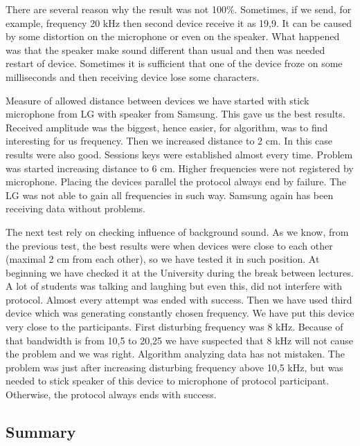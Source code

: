 \documentclass[11pt,titlepage]{article}
\theoremstyle{plain}
\begin{document}
\vspace{5mm}

There are several reason why the result was not 100\%. Sometimes, if we send, for example, frequency 20 kHz then second device receive it as 19,9. It can be caused by some distortion on the microphone or even on the speaker. What happened was that the speaker make sound different than usual and then was needed restart of device. Sometimes it is sufficient that one of the device froze on some milliseconds and then receiving device lose some characters. 

\vspace{5mm}

Measure of allowed distance between devices we have started with stick microphone from LG with speaker from Samsung. This gave us the best results. Received amplitude was the biggest, hence easier, for algorithm, was to find interesting for us frequency. Then we increased distance to 2 cm. In this case results were also good. Sessions keys were established almost every time. Problem was started increasing distance to 6 cm. Higher frequencies were not registered by microphone. Placing the devices parallel the protocol always end by failure. The LG was not able to gain all frequencies in such way. Samsung again has been receiving data without problems. 

\vspace{5mm}

The next test rely on checking influence of background sound. As we know, from the previous test, the best results were when devices were close to each other (maximal 2 cm from each other), so we have tested it in such position. At beginning we have checked it at the University during the break between lectures. A lot of students was talking and laughing but even this, did not interfere with protocol. Almost every attempt was ended with success. Then we have used third device which was generating constantly chosen frequency. We have put this device very close to the participants. First disturbing frequency was 8 kHz. Because of that bandwidth is from 10,5 to 20,25 we have suspected that 8 kHz will not cause the problem and we was right. Algorithm analyzing data has not mistaken. The problem was just after increasing disturbing frequency above 10,5 kHz, but was needed to stick speaker of this device to microphone of protocol participant. Otherwise, the protocol always ends with success. 


\subsection{Summary}





\end{document}
